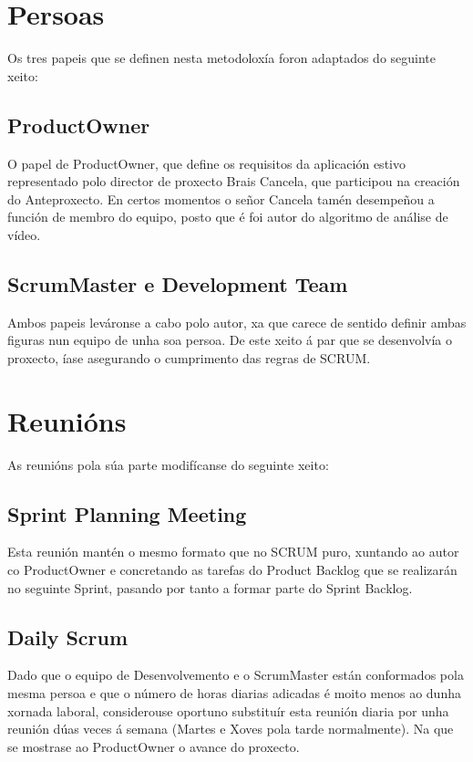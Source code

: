 \section{Persoas}

    Os tres papeis que se definen nesta metodoloxía \cite{la-guia-de-scrum} foron 
    adaptados do seguinte xeito:

    \subsection{ProductOwner}
        O papel de ProductOwner, que define os requisitos da aplicación estivo representado 
        polo director de proxecto Brais Cancela, que participou na creación do Anteproxecto.
        En certos momentos o señor Cancela tamén desempeñou a función de membro do equipo, 
        posto que é foi autor do algoritmo de análise de vídeo. 

    \subsection{ScrumMaster e Development Team}
        Ambos papeis leváronse a cabo polo autor, xa que carece de sentido definir ambas figuras
        nun equipo de unha soa persoa. De este xeito á par que se desenvolvía o proxecto, íase
        asegurando o cumprimento das regras de SCRUM.
    
\section{Reunións}
As reunións pola súa parte modifícanse do seguinte xeito:

    \subsection{Sprint Planning Meeting}
        Esta reunión mantén o mesmo formato que no SCRUM puro, xuntando ao autor co	ProductOwner 
        e concretando as tarefas do Product Backlog que se realizarán no seguinte Sprint, pasando
        por tanto a formar parte do Sprint Backlog.
    
    \subsection{Daily Scrum}
        Dado que o equipo de Desenvolvemento e o ScrumMaster están conformados pola mesma persoa
        e que o número de horas diarias adicadas é moito menos ao dunha xornada laboral, considerouse
        oportuno substituír esta reunión diaria por unha reunión dúas veces á semana (Martes e Xoves 
        pola tarde normalmente). Na que se mostrase ao ProductOwner o avance do proxecto.
    

